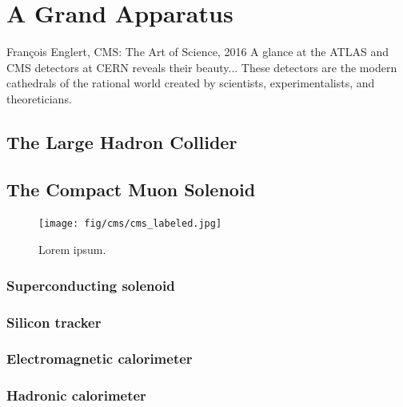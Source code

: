 \chapter{A Grand Apparatus}\label{ch:lhc_cms}
\begin{aquote}{Fran\c{c}ois Englert, CMS: The Art of Science, 2016}
    A glance at the ATLAS and CMS detectors at CERN reveals their beauty...
    These detectors are the modern cathedrals of the rational world created by scientists, experimentalists, and theoreticians. 
\end{aquote}
\section{The Large Hadron Collider}
\section{The Compact Muon Solenoid}
\begin{figure}[htb]
    \centering
    \texttt{[image: fig/cms/cms\_labeled.jpg]}
    \caption{
        Lorem ipsum.
    }
    \label{fig:cms_labeled}
\end{figure}
\subsection{Superconducting solenoid}
\subsection{Silicon tracker}
\subsection{Electromagnetic calorimeter}
\subsection{Hadronic calorimeter}
